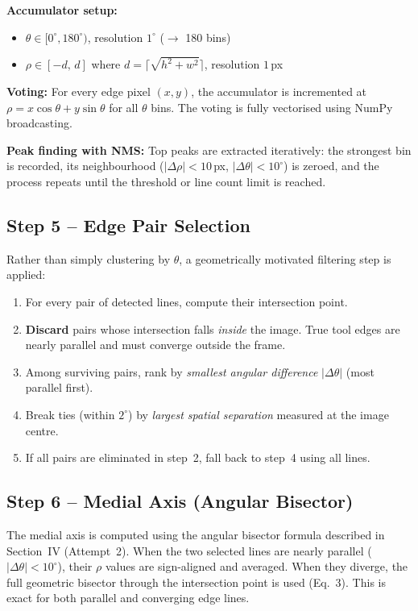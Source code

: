 \documentclass[conference, twocolumn]{IEEEtran}
\begin{document}
\textbf{Accumulator setup:}
\begin{itemize}
    \item $\theta \in [0^\circ, 180^\circ)$, resolution $1^\circ$ ($\to$ 180 bins)
    \item $\rho \in [-d,\, d]$ where $d = \lceil\sqrt{h^2+w^2}\rceil$, resolution $1$\,px
\end{itemize}

\textbf{Voting:} For every edge pixel $(x, y)$, the accumulator is incremented at $\rho = x\cos\theta + y\sin\theta$ for all $\theta$ bins. The voting is fully vectorised using NumPy broadcasting.

\textbf{Peak finding with NMS:} Top peaks are extracted iteratively: the strongest bin is recorded, its neighbourhood ($|\Delta\rho| < 10$\,px, $|\Delta\theta| < 10^\circ$) is zeroed, and the process repeats until the threshold or line count limit is reached.

\subsection{Step 5 -- Edge Pair Selection}

Rather than simply clustering by $\theta$, a geometrically motivated filtering step is applied:

\begin{enumerate}
    \item For every pair of detected lines, compute their intersection point.
    \item \textbf{Discard} pairs whose intersection falls \emph{inside} the image. True tool edges are nearly parallel and must converge outside the frame.
    \item Among surviving pairs, rank by \emph{smallest angular difference} $|\Delta\theta|$ (most parallel first).
    \item Break ties (within $2^\circ$) by \emph{largest spatial separation} measured at the image centre.
    \item If all pairs are eliminated in step~2, fall back to step~4 using all lines.
\end{enumerate}

\subsection{Step 6 -- Medial Axis (Angular Bisector)}

The medial axis is computed using the angular bisector formula described in Section~IV (Attempt~2). When the two selected lines are nearly parallel ($|\Delta\theta| < 10^\circ$), their $\rho$ values are sign-aligned and averaged. When they diverge, the full geometric bisector through the intersection point is used (Eq.~3). This is exact for both parallel and converging edge lines.
\end{document}
